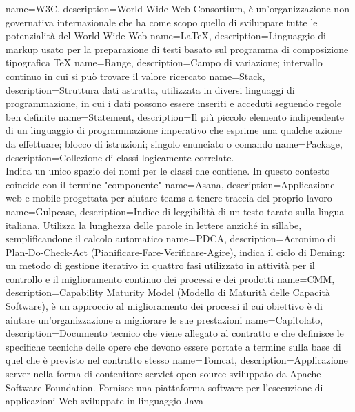  {
	name=W3C,
	description={World Wide Web Consortium, è un'organizzazione non governativa internazionale che
	ha come scopo quello di sviluppare tutte le potenzialità del World Wide Web}
}
 {
	name=LaTeX,
	description={Linguaggio di markup usato per la preparazione di testi basato sul programma di
	composizione tipografica TeX}
}
 {
	name=Range,
	description={Campo di variazione; intervallo continuo in cui si può trovare il valore
	ricercato}
}
 {
	name=Stack,
	description={Struttura dati astratta, utilizzata in diversi linguaggi di programmazione,
	in cui i dati possono essere inseriti e acceduti seguendo regole ben definite}
}
 {
	name=Statement,
	description={Il più piccolo elemento indipendente di un linguaggio di programmazione imperativo
	che esprime una qualche azione da effettuare; blocco di istruzioni;
	singolo enunciato o comando}
}
 {
	name=Package,
	description={Collezione di classi logicamente correlate.\\
	Indica un unico spazio dei nomi per le classi che contiene. In questo contesto coincide
	con il termine "componente"}
}
 {
	name=Asana,
	description={Applicazione web e mobile progettata per aiutare teams a tenere traccia del
	proprio lavoro}
}
 {
	name=Gulpease,
	description={Indice di leggibilità di un testo tarato sulla lingua italiana. Utilizza la
	lunghezza delle parole in lettere anziché in sillabe, semplificandone il calcolo automatico}
}
 {
	name=PDCA,
	description={Acronimo di Plan-Do-Check-Act (Pianificare-Fare-Verificare-Agire), indica il
	ciclo di Deming: un metodo di gestione iterativo in quattro fasi utilizzato in attività per
	il controllo e il miglioramento continuo dei processi e	dei prodotti}
}
 {
	name=CMM,
	description={Capability Maturity Model (Modello di Maturità delle Capacità Software), è
	un approccio al miglioramento dei processi il cui obiettivo è di aiutare un'organizzazione a
	migliorare le sue prestazioni}
}
 {
	name=Capitolato,
	description={Documento tecnico che viene allegato al contratto e che definisce le specifiche
	tecniche delle opere che devono essere portate a termine sulla base di quel che è previsto
	nel contratto stesso}
}
 {
	name=Tomcat,
	description={Applicazione server nella forma di contenitore servlet open-source sviluppato
	da Apache Software Foundation. Fornisce una piattaforma software per l'esecuzione di
	applicazioni Web sviluppate in linguaggio Java}
}
